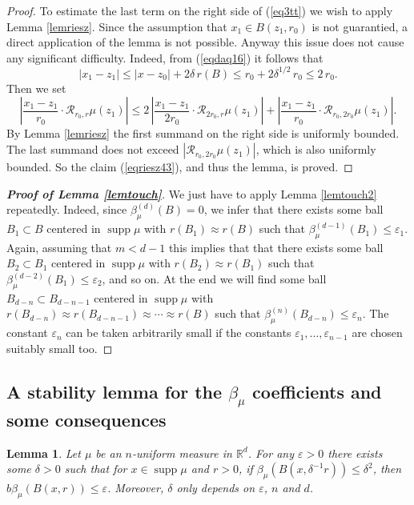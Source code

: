 \documentclass[11pt]{amsart}
\newcommand{\R}{{\mathbb R}}       %
\newcommand{\RR}{{\mathcal R}}
\newcommand{\rf}[1]{{(\ref{#1})}}
\newcommand{\supp}{\operatorname{supp}}
\newcommand{\ve}{{\varepsilon}}
\newcommand{\vv}{{\vspace{2mm}}}
\newtheorem{lemma}[theorem]{Lemma}
\theoremstyle{definition}
\theoremstyle{remark}
\numberwithin{equation}{section}
\begin{document}
\begin{proof}
To estimate the last term on the right side of \rf{eq3tt} we wish to apply Lemma \ref{lemriesz}. 
Since the assumption that $x_1\in B(z_1,r_0)$ is not guarantied, a direct application of the lemma
is not possible. Anyway this issue does not cause any significant difficulty. Indeed, from \rf{eqdaq16}
it follows that
$$|x_1-z_1|\leq |x-z_0| + 2\delta\,r(B) \leq r_0 + 2\delta^{1/2}\,r_0 \leq 2\,r_0.$$
Then we set
$$\left|\frac{x_1-z_1}{r_0}\cdot\RR_{r_0,r}\mu(z_1)\right|\leq 
2\,\left|\frac{x_1-z_1}{2r_0}\cdot\RR_{2r_0,r}\mu(z_1)\right| +
\left|\frac{x_1-z_1}{r_0}\cdot\RR_{r_0,2r_0}\mu(z_1)\right|.$$
By Lemma \ref{lemriesz} the first summand on the right side is uniformly bounded. The last summand 
does not exceed $|\RR_{r_0,2r_0}\mu(z_1)|$, which is also uniformly bounded.
So the claim \rf{eqriesz43}, and thus the lemma, is proved.
\end{proof}


\vv
\begin{proof}[\bf Proof of Lemma \ref{lemtouch}]
We just have to apply Lemma \ref{lemtouch2} repeatedly. Indeed, since $\beta^{(d)}_\mu(B)=0$,
we infer that there exists some ball $B_1\subset B$ centered in $\supp\mu$ with $r(B_1)\approx r(B)$ such that
$\beta^{(d-1)}_\mu(B_1)\leq \ve_1$. Again, assuming that $m<d-1$ this implies that that there exists
some ball $B_2\subset B_1$ centered in $\supp\mu$ with $r(B_2)\approx r(B_1)$ such that
$\beta^{(d-2)}_\mu(B_1)\leq \ve_2$, and so on. At the end we will find some ball
$B_{d-n}\subset B_{d-n-1}$ centered in $\supp\mu$ with $r(B_{d-n})\approx r(B_{d-n-1})\approx\cdots \approx r(B)$ such that
$\beta^{(n)}_\mu(B_{d-n})\leq \ve_n$. The constant $\ve_n$ can be taken arbitrarily small if the constants
$\ve_1,\ldots,\ve_{n-1}$ are chosen suitably small too.
\end{proof}
\vv




\vv






\subsection{A stability lemma for the $\beta_\mu$ coefficients and some consequences}


\begin{lemma}\label{lemfac1}
Let $\mu$ be an $n$-uniform measure in $\R^d$. For any $\ve>0$ there exists some $\delta>0$ such that
for $x\in\supp\mu$ and $r>0$, 
if $\beta_\mu(B(x,\delta^{-1}r))\leq\delta^2$, then $b\beta_\mu(B(x,r))\leq\ve$. 
Moreover, $\delta$ only depends on $\ve$, $n$ and $d$.
\end{lemma}
\end{document}

